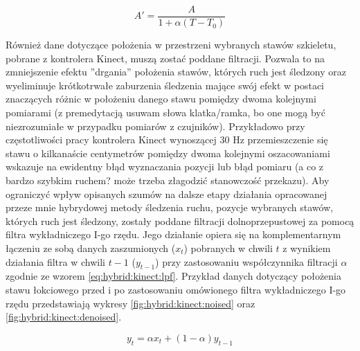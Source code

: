 \begin{equation}
	A' = \frac{A}{1+\alpha(T-T_0)}
	\label{eq:hybrid:temperatureCorrection}
\end{equation}

Również dane dotyczące położenia w przestrzeni wybranych stawów szkieletu, pobrane z kontrolera Kinect, muszą zostać poddane filtracji. Pozwala to na zmniejszenie efektu ''drgania'' położenia stawów, których ruch jest śledzony oraz wyeliminuje krótkotrwałe zaburzenia śledzenia mające swój efekt w postaci znaczących różnic w położeniu danego stawu pomiędzy dwoma kolejnymi pomiarami (z premedytacją usuwam słowa klatka/ramka, bo one mogą być niezrozumiałe w przypadku pomiarów z czujników). Przykładowo przy częstotliwości pracy kontrolera Kinect wynoszącej 30 Hz przemieszczenie się stawu o kilkanaście centymetrów pomiędzy dwoma kolejnymi oszacowaniami wskazuje na ewidentny błąd wyznaczania pozycji lub błąd pomiaru (a co z bardzo szybkim ruchem? może trzeba złagodzić stanowczość przekazu). Aby ograniczyć wpływ opisanych szumów na dalsze etapy działania opracowanej przeze mnie hybrydowej metody śledzenia ruchu, pozycje wybranych stawów, których ruch jest śledzony, zostały poddane filtracji dolnoprzepustowej za pomocą filtra wykładniczego I-go rzędu. Jego działanie opiera się na komplementarnym łączeniu ze sobą danych zaszumionych ($x_t$) pobranych w chwili $t$ z wynikiem działania filtra w chwili $t-1$ ($y_{t-1}$) przy zastosowaniu współczynnika filtracji $\alpha$ zgodnie ze wzorem \eqref{eq:hybrid:kinect:lpf}. Przykład danych dotyczący położenia stawu łokciowego przed i po zastosowaniu omówionego filtra wykładniczego I-go rzędu przedstawiają wykresy \ref{fig:hybrid:kinect:noised} oraz \ref{fig:hybrid:kinect:denoised}.

\begin{equation}
	\label{eq:hybrid:kinect:lpf}
	y_t = \alpha x_t + (1-\alpha)y_{t-1}
\end{equation}

